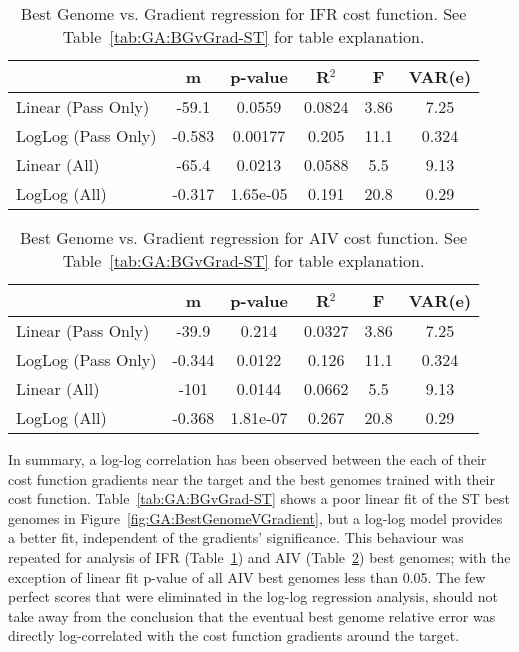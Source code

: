 \begin{table}[th]
  \centering
  \begin{tabular}{lccccc}
                   &   m    & p-value  & R$^2$  &   F  & VAR(e) \\[1ex] \hline
Linear (Pass Only) & -59.1  &  0.0559  & 0.0824 & 3.86 & 7.25    \\
LogLog (Pass Only) & -0.583 & 0.00177  & 0.205  & 11.1 & 0.324  \\[0.5ex] \hline
   Linear (All)    & -65.4  &  0.0213  & 0.0588 & 5.5  & 9.13     \\
   LogLog (All)    & -0.317 & 1.65e-05 & 0.191  & 20.8 & 0.29   \\[1ex] \hline    
\end{tabular}
  \caption{Best Genome vs. Gradient regression for IFR cost function. See Table~\ref{tab:GA:BGvGrad-ST} for table explanation.}
  \label{tab:GA:BGvGrad-IFR}
\end{table}


\begin{table}[th]
  \centering
  \begin{tabular}{lccccc}
                   &   m    & p-value  & R$^2$  &  F   & VAR(e)\\[1ex] \hline
Linear (Pass Only) & -39.9  &  0.214   & 0.0327 & 3.86 & 7.25 \\
LogLog (Pass Only) & -0.344 &  0.0122  & 0.126  & 11.1 & 0.324\\[0.5ex] \hline
   Linear (All)    &  -101  &  0.0144  & 0.0662 & 5.5  & 9.13 \\
   LogLog (All)    & -0.368 & 1.81e-07 & 0.267  & 20.8 & 0.29 \\[1ex] \hline    
\end{tabular}
  \caption{Best Genome vs. Gradient regression for AIV cost function.  See Table~\ref{tab:GA:BGvGrad-ST} for table explanation.}
  \label{tab:GA:BGvGrad-AIV}
\end{table}



In summary, a log-log correlation has been observed between the each
of their cost function gradients near the target and the best genomes
trained with their cost function. Table~\ref{tab:GA:BGvGrad-ST} shows
a poor linear fit of the ST best genomes in
Figure~\ref{fig:GA:BestGenomeVGradient}, but a log-log model provides
a better fit, independent of the gradients' significance. This
behaviour was repeated for analysis of IFR
(Table~\ref{tab:GA:BGvGrad-IFR}) and AIV
(Table~\ref{tab:GA:BGvGrad-AIV}) best genomes; with the exception of
linear fit p-value of all AIV best genomes less than 0.05.  The few
perfect scores that were eliminated in the log-log regression
analysis, should not take away from the conclusion that the {\GAs}
eventual best genome relative error was directly log-correlated with
the cost function gradients around the target.




